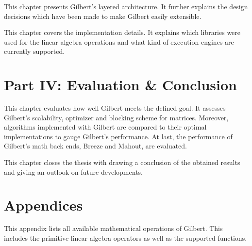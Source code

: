 \vspace{3mm}


\noindent This chapter presents Gilbert's layered architecture.
It further explains the design decisions which have been made to make Gilbert easily extensible.

\vspace{3mm}


\noindent This chapter covers the implementation details.
It explains which libraries were used for the linear algebra operations and what kind of execution engines are currently supported.

\vspace{3mm}

\section*{Part IV: Evaluation \& Conclusion}

\vspace{3mm}


This chapter evaluates how well Gilbert meets the defined goal.
It assesses Gilbert's scalability, optimizer and blocking scheme for matrices.
Moreover, algorithms implemented with Gilbert are compared to their optimal implementations to gauge Gilbert's performance.
At last, the performance of Gilbert's math back ends, Breeze and Mahout, are evaluated.

\vspace{3mm}


This chapter closes the thesis with drawing a conclusion of the obtained results and giving an outlook on future developments.

\vspace{3mm}

\section*{Appendices}

\vspace{3mm}


This appendix lists all available mathematical operations of Gilbert.
This includes the primitive linear algebra operators as well as the supported functions.